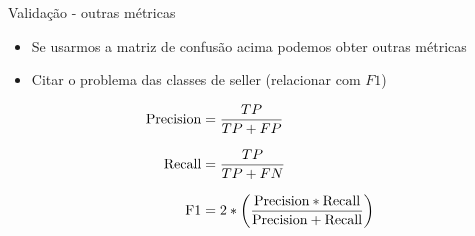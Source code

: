 \begin{frame}	
	\begin{block}{Validação - outras métricas}	
		\begin{itemize}
			\item Se usarmos a matriz de confusão acima podemos obter outras métricas
			\item Citar o problema das classes de seller (relacionar com $F1$)
		\end{itemize}
		\begin{equation*}
			\setlength{\jot}{10pt}
				\begin{aligned}
					\textrm{Precision} &= \frac{TP}{TP + FP} \\
					\textrm{Recall} &= \frac{TP}{TP + FN} \\
					\textrm{F1} &= 2 * \left(  \frac{\textrm{Precision}  * \textrm{Recall}}{\textrm{Precision}  + \textrm{Recall}} \right)
				\end{aligned}
		\end{equation*}
	\end{block}
\end{frame}